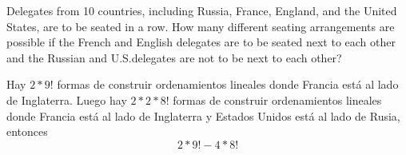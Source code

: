 \item Delegates from 10 countries, including Russia, France, England, and the United States, are to be seated in a row. How many different seating arrangements are possible if the French and English delegates are to be seated next to each other and the Russian and U.S.\@ delegates are not to be next to each other?

Hay $2 * 9!$ formas de construir ordenamientos lineales donde Francia está al lado de Inglaterra. Luego hay $2 * 2 * 8!$ formas de construir ordenamientos lineales donde Francia está al lado de Inglaterra y Estados Unidos está al lado de Rusia, entonces
\[ 2 * 9! - 4 * 8! \]